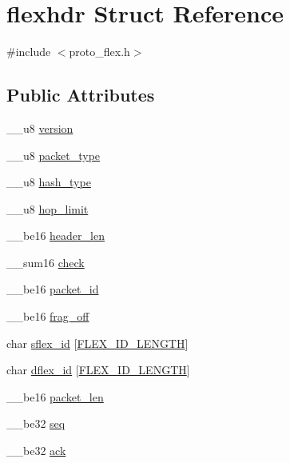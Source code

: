 \hypertarget{structflexhdr}{}\section{flexhdr Struct Reference}
\label{structflexhdr}


{\ttfamily \#include $<$proto\+\_\+flex.\+h$>$}

\subsection*{Public Attributes}
\begin{DoxyCompactItemize}
\item 
\+\_\+\+\_\+u8 \hyperlink{structflexhdr_a58658c0c3ac88c2ae21cf52cdbeaefd0}{version}
\item 
\+\_\+\+\_\+u8 \hyperlink{structflexhdr_a3e17e4077f496e9eed85b5705a40b06f}{packet\+\_\+type}
\item 
\+\_\+\+\_\+u8 \hyperlink{structflexhdr_aa2a7292e9ff348680f83067955b58d0f}{hash\+\_\+type}
\item 
\+\_\+\+\_\+u8 \hyperlink{structflexhdr_a550e9254701dcd7665cdc1d52f9599fa}{hop\+\_\+limit}
\item 
\+\_\+\+\_\+be16 \hyperlink{structflexhdr_a7a2903458e61241565c61177a87c6dbb}{header\+\_\+len}
\item 
\+\_\+\+\_\+sum16 \hyperlink{structflexhdr_a7e2d0c232c92ea39204ec52563cbd33e}{check}
\item 
\+\_\+\+\_\+be16 \hyperlink{structflexhdr_a15281b3aa64868e176dffbb7ee5f2acc}{packet\+\_\+id}
\item 
\+\_\+\+\_\+be16 \hyperlink{structflexhdr_a85f045e7acaf63edb2cd192266ef49bf}{frag\+\_\+off}
\item 
char \hyperlink{structflexhdr_a3d0b687dac926a77cde8a5cc01f05533}{sflex\+\_\+id} \mbox{[}\hyperlink{flex__const_8h_a342f27a8d723d83c803e6d934f999ada}{F\+L\+E\+X\+\_\+\+I\+D\+\_\+\+L\+E\+N\+G\+TH}\mbox{]}
\item 
char \hyperlink{structflexhdr_aab2628ec55f6dedda9cd48de1677d49c}{dflex\+\_\+id} \mbox{[}\hyperlink{flex__const_8h_a342f27a8d723d83c803e6d934f999ada}{F\+L\+E\+X\+\_\+\+I\+D\+\_\+\+L\+E\+N\+G\+TH}\mbox{]}
\item 
\+\_\+\+\_\+be16 \hyperlink{structflexhdr_a8e177eb08fa03f382eb67f75d9bf16b9}{packet\+\_\+len}
\item 
\+\_\+\+\_\+be32 \hyperlink{structflexhdr_a1f437e344ae8752c7ea0586104bf67b4}{seq}
\item 
\+\_\+\+\_\+be32 \hyperlink{structflexhdr_a9504db4a12b79baa7937e1d11f521e57}{ack}
\end{DoxyCompactItemize}


